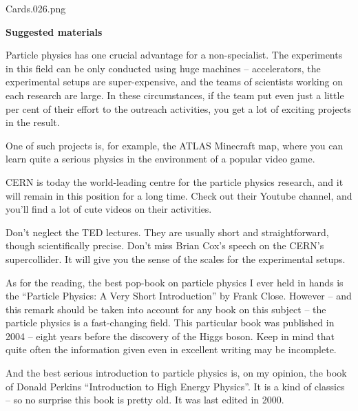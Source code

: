 {%
}{{Cards.026}.png}


\thispagestyle{fancy}
\fancyhf{}
\renewcommand{\headrulewidth}{0pt}
\fancyfoot{}
{\huge{\textbf{Suggested materials}}}
\vskip12pt

Particle physics has one crucial advantage for a non-specialist. The experiments in this field can be only conducted using huge machines -- accelerators, the experimental setups are super-expensive, and the teams of scientists working on each research are large. In these circumstances, if the team put even just a little per cent of their effort to the outreach activities, you get a lot of exciting projects in the result.

One of such projects is, for example, the ATLAS Minecraft map, where you can learn quite a serious physics in the environment of a popular video game.

CERN is today the world-leading centre for the particle physics research, and it will remain in this position for a long time. Check out their Youtube channel, and you'll find a lot of cute videos on their activities.

Don't neglect the TED lectures. They are usually short and straightforward, though scientifically precise. Don't miss Brian Cox's speech on the CERN's supercollider. It will give you the sense of the scales for the experimental setups.

As for the reading, the best pop-book on particle physics I ever held in hands is the ``Particle Physics: A Very Short Introduction'' by Frank Close. However -- and this remark should be taken into account for any book on this subject -- the particle physics is a fast-changing field. This particular book was published in 2004 -- eight years before the discovery of the Higgs boson. Keep in mind that quite often the information given even in excellent writing may be incomplete.

And the best serious introduction to particle physics is, on my opinion, the book of Donald Perkins ``Introduction to High Energy Physics''. It is a kind of classics -- so no surprise this book is pretty old. It was last edited in 2000.

\newpage